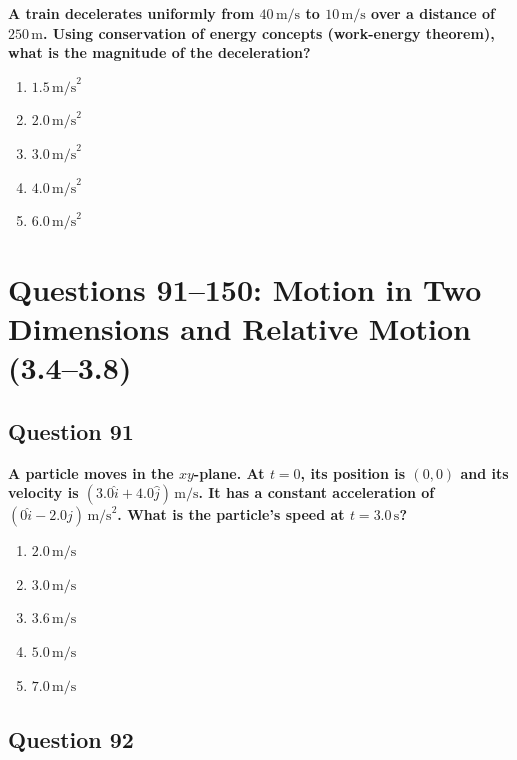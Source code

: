 \documentclass[12pt,letterpaper]{article}
\begin{document}
\begin{questionbox}
\textbf{A train decelerates uniformly from $40\,\text{m/s}$ to $10\,\text{m/s}$ over a distance of $250\,\text{m}$. Using conservation of energy concepts (work-energy theorem), what is the magnitude of the deceleration?}

\begin{enumerate}[label=\alph*)]
    \item $1.5\,\text{m/s}^2$
    \item $2.0\,\text{m/s}^2$
    \item $3.0\,\text{m/s}^2$
    \item $4.0\,\text{m/s}^2$
    \item $6.0\,\text{m/s}^2$
\end{enumerate}
\end{questionbox}

\section{Questions 91--150: Motion in Two Dimensions and Relative Motion (3.4--3.8)}

\subsection{Question 91}

\begin{questionbox}
\textbf{A particle moves in the $xy$-plane. At $t = 0$, its position is $(0, 0)$ and its velocity is $(3.0\hat{i} + 4.0\hat{j})\,\text{m/s}$. It has a constant acceleration of $(0\hat{i} - 2.0\hat{j})\,\text{m/s}^2$. What is the particle's speed at $t = 3.0\,\text{s}$?}

\begin{enumerate}[label=\alph*)]
    \item $2.0\,\text{m/s}$
    \item $3.0\,\text{m/s}$
    \item $3.6\,\text{m/s}$
    \item $5.0\,\text{m/s}$
    \item $7.0\,\text{m/s}$
\end{enumerate}
\end{questionbox}

\subsection{Question 92}
\end{document}
